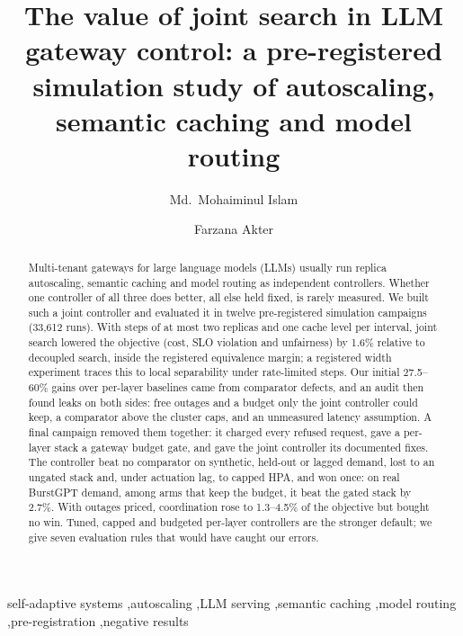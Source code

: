 \documentclass[preprint,12pt]{elsarticle}
\newif\ifblind
\begin{document}
\begin{frontmatter}

\title{The value of joint search in LLM gateway control: a pre-registered
simulation study of autoscaling, semantic caching and model routing}

\ifblind
\author{Anonymous authors}
\else
\author[ete]{Md.\ Mohaiminul Islam}
\author[ete]{Farzana Akter}
\fi

\begin{abstract}
Multi-tenant gateways for large language models (LLMs) usually run replica
autoscaling, semantic caching and model routing as independent controllers.
Whether one controller of all three does better, all else held fixed, is
rarely measured. We built such a joint controller and evaluated it in twelve
pre-registered simulation campaigns (33,612 runs). With steps of at most two
replicas and one cache level per interval, joint search lowered the
objective (cost, SLO violation and unfairness) by 1.6\% relative to
decoupled search, inside the registered equivalence margin; a registered
width experiment traces this to local separability under rate-limited
steps. Our initial 27.5--60\% gains over per-layer baselines came from
comparator defects, and an audit then found leaks on both sides: free
outages and a budget only the joint controller could keep, a comparator
above the cluster caps, and an unmeasured latency assumption. A final
campaign removed them together: it charged every refused request, gave a
per-layer stack a gateway budget gate, and gave the joint controller its
documented fixes. The controller beat no comparator on synthetic, held-out
or lagged demand, lost to an ungated stack and, under actuation lag, to
capped HPA, and won once: on real BurstGPT demand, among arms that keep the
budget, it beat the gated stack by 2.7\%. With outages priced, coordination
rose to 1.3--4.5\% of the objective but bought no win. Tuned, capped and
budgeted per-layer controllers are the stronger default; we give seven
evaluation rules that would have caught our errors.
\end{abstract}

\begin{keyword}
self-adaptive systems \sep autoscaling \sep LLM serving \sep semantic
caching \sep model routing \sep pre-registration \sep negative results
\end{keyword}

\end{frontmatter}
\end{document}
